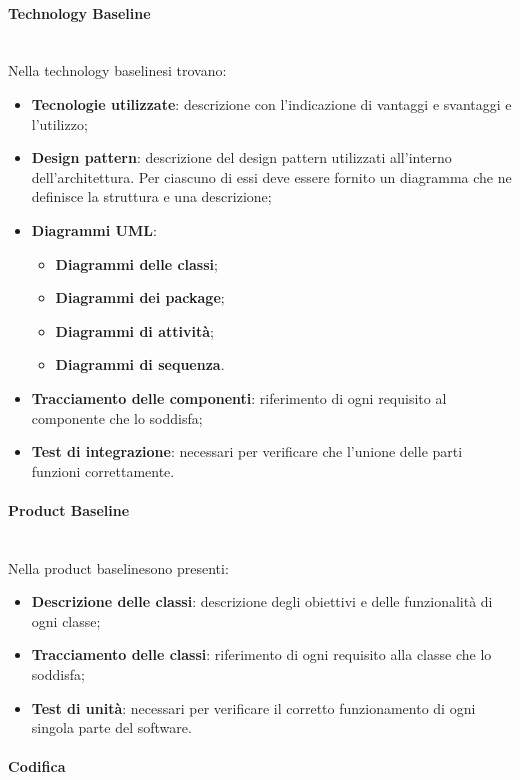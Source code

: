 \paragraph*{Technology Baseline}\mbox{}\\ [1mm]
Nella technology baseline\glosp si trovano:
\begin{itemize}
	\item \textbf{Tecnologie utilizzate}: descrizione con l'indicazione di vantaggi e svantaggi e l'utilizzo;
	\item \textbf{Design pattern}: descrizione del design pattern utilizzati all'interno dell'architettura. Per ciascuno di essi deve essere fornito un diagramma che ne definisce la struttura e una descrizione;
	\item \textbf{Diagrammi UML}:
	\begin{itemize}
		\item \textbf{Diagrammi delle classi};
		\item \textbf{Diagrammi dei package};
		\item \textbf{Diagrammi di attività};
		\item \textbf{Diagrammi di sequenza}.
	\end{itemize}
	\item \textbf{Tracciamento delle componenti}: riferimento di ogni requisito al componente che lo soddisfa;
	\item \textbf{Test di integrazione}: necessari per verificare che l'unione delle parti funzioni correttamente.
\end{itemize}
\paragraph*{Product Baseline}\mbox{}\\ [1mm]
Nella product baseline\glosp sono presenti:
\begin{itemize}
	\item \textbf{Descrizione delle classi}: descrizione degli obiettivi e delle funzionalità di ogni classe;
	\item \textbf{Tracciamento delle classi}: riferimento di ogni requisito alla classe che lo soddisfa;
	\item \textbf{Test di unità}: necessari per verificare il corretto funzionamento di ogni singola parte del software.
\end{itemize}
\paragraph{Codifica}
